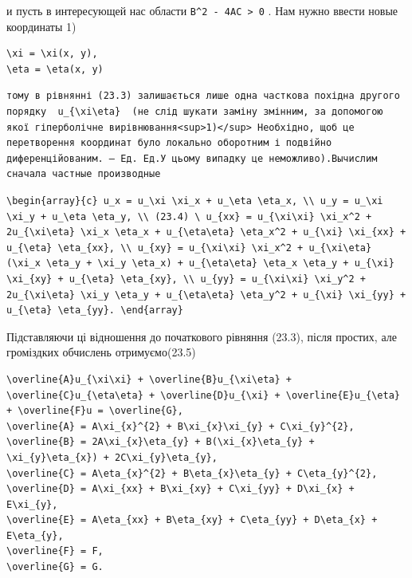 \documentclass[
  ukrainian,
]{article}
\begin{document}
и пусть в интересующей нас области
\texttt{B\^{}2\ -\ 4AC\ \textgreater{}\ 0} . Нам нужно ввести новые
координаты 1)

\begin{verbatim}
\xi = \xi(x, y),
\eta = \eta(x, y)
\end{verbatim}

\begin{verbatim}
тому в рівнянні (23.3) залишається лише одна часткова похідна другого порядку  u_{\xi\eta}  (не слід шукати заміну змінним, за допомогою якої гіперболічне вирівнювання<sup>1)</sup> Необхідно, щоб це перетворення координат було локально оборотним і подвійно диференційованим. — Ед. Ед.У цьому випадку це неможливо).Вычислим сначала частные производные
\end{verbatim}

\begin{verbatim}
\begin{array}{c} u_x = u_\xi \xi_x + u_\eta \eta_x, \\ u_y = u_\xi \xi_y + u_\eta \eta_y, \\ (23.4) \ u_{xx} = u_{\xi\xi} \xi_x^2 + 2u_{\xi\eta} \xi_x \eta_x + u_{\eta\eta} \eta_x^2 + u_{\xi} \xi_{xx} + u_{\eta} \eta_{xx}, \\ u_{xy} = u_{\xi\xi} \xi_x^2 + u_{\xi\eta} (\xi_x \eta_y + \xi_y \eta_x) + u_{\eta\eta} \eta_x \eta_y + u_{\xi} \xi_{xy} + u_{\eta} \eta_{xy}, \\ u_{yy} = u_{\xi\xi} \xi_y^2 + 2u_{\xi\eta} \xi_y \eta_y + u_{\eta\eta} \eta_y^2 + u_{\xi} \xi_{yy} + u_{\eta} \eta_{yy}. \end{array}
\end{verbatim}

Підставляючи ці відношення до початкового рівняння (23.3), після
простих, але громіздких обчислень отримуємо(23.5)

\begin{verbatim}
\overline{A}u_{\xi\xi} + \overline{B}u_{\xi\eta} + \overline{C}u_{\eta\eta} + \overline{D}u_{\xi} + \overline{E}u_{\eta} + \overline{F}u = \overline{G},
\overline{A} = A\xi_{x}^{2} + B\xi_{x}\xi_{y} + C\xi_{y}^{2},
\overline{B} = 2A\xi_{x}\eta_{y} + B(\xi_{x}\eta_{y} + \xi_{y}\eta_{x}) + 2C\xi_{y}\eta_{y},
\overline{C} = A\eta_{x}^{2} + B\eta_{x}\eta_{y} + C\eta_{y}^{2},
\overline{D} = A\xi_{xx} + B\xi_{xy} + C\xi_{yy} + D\xi_{x} + E\xi_{y},
\overline{E} = A\eta_{xx} + B\eta_{xy} + C\eta_{yy} + D\eta_{x} + E\eta_{y},
\overline{F} = F,
\overline{G} = G.
\end{verbatim}
\end{document}
